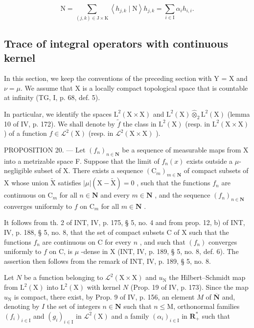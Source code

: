 \[
\mathrm{N} = \sum_ {(j, k) \in \mathrm{J} \times \mathrm{K}} \left\langle h _ {j, k} \mid \mathrm{N} \right\rangle h _ {j, k} = \sum_ {i \in \mathrm{I}} \alpha_ {i} h _ {i, i}.
\]

\subsection{Trace of integral operators with continuous kernel}

In this section, we keep the conventions of the preceding section with Y = X and \(\nu = \mu\). We assume that X is a locally compact topological space that is countable at infinity (TG, I, p. 68, def. 5).

In particular, we identify the spaces \(\mathrm{L}^{2}(\mathrm{X}\times\mathrm{X})\) and \(\mathrm{L}^{2}(\mathrm{X})\widehat{\otimes}_{2}\mathrm{L}^{2}(\mathrm{X})\) (lemma 10 of IV, p. 172). We shall denote by \(\widetilde{f}\) the class in \(\mathrm{L}^{2}(\mathrm{X})\) (resp. in \(\mathrm{L}^{2}(\mathrm{X}\times\mathrm{X})\) ) of a function \(f\in\mathcal{L}^{2}(\mathrm{X})\) (resp. in \(\mathcal{L}^{2}(\mathrm{X}\times\mathrm{X})\) ).

PROPOSITION 20. --- Let \((f_n)_{n \in \mathbf{N}}\) be a sequence of measurable maps from X into a metrizable space F. Suppose that the limit of \(f_n(x)\) exists outside a \(\mu\)-negligible subset of X. There exists a sequence \((\mathrm{C}_m)_{m \in \mathbf{N}}\) of compact subsets of X whose union \(\widetilde{\mathrm{X}}\) satisfies \(|\mu|(\mathrm{X} - \widetilde{\mathrm{X}}) = 0\) , such that the functions \(f_n\) are continuous on \(\mathrm{C}_m\) for all \(n \in \mathbf{N}\) and every \(m \in \mathbf{N}\) , and the sequence \((f_n)_{n \in \mathbf{N}}\) converges uniformly to \(f\) on \(\mathrm{C}_m\) for all \(m \in \mathbf{N}\) .

It follows from th. 2 of INT, IV, p. 175, § 5, no. 4 and from prop. 12, b) of INT, IV, p. 188, § 5, no. 8, that the set of compact subsets C of X such that the functions \(f_n\) are continuous on C for every \(n\) , and such that \((f_n)\) converges uniformly to \(f\) on C, is \(\mu\) -dense in X (INT, IV, p. 189, § 5, no. 8, def. 6). The assertion then follows from the remark of INT, IV, p. 189, § 5, no. 8.

Let \(N\) be a function belonging to \(\mathcal{L}^2 (\mathrm{X}\times \mathrm{X})\) and \(u_{\mathrm{N}}\) the Hilbert--Schmidt map from \(\mathrm{L}^2 (\mathrm{X})\) into \(\mathrm{L}^2 (\mathrm{X})\) with kernel \(N\) (Prop. 19 of IV, p. 173). Since the map \(u_{\mathrm{N}}\) is compact, there exist, by Prop. 9 of IV, p. 156, an element \(M\) of \(\overline{\mathbf{N}}\) and, denoting by \(I\) the set of integers \(n\in \mathbf{N}\) such that \(n\leqslant \mathrm{M}\), orthonormal families \((f_i)_{i\in \mathrm{I}}\) and \((g_{i})_{i\in \mathrm{I}}\) in \(\mathcal{L}^2 (\mathrm{X})\) and a family \((\alpha_{i})_{i\in \mathrm{I}}\) in \(\mathbf{R}_+^*\) such that

